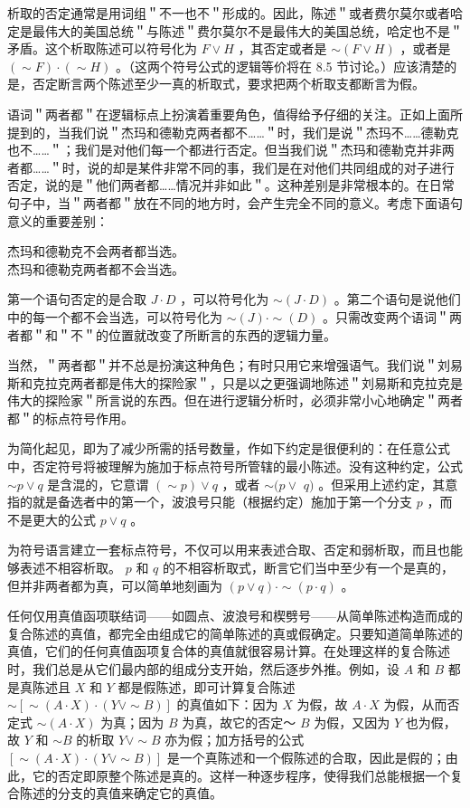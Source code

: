 析取的否定通常是用词组＂不一也不＂形成的。因此，陈述＂或者费尔莫尔或者哈定是最伟大的美国总统＂与陈述＂费尔莫尔不是最伟大的美国总统，哈定也不是＂矛盾。这个析取陈述可以符号化为 $F \vee H$ ，其否定或者是 $\sim(F \vee H)$ ，或者是 $(\sim F) \cdot(\sim H)$ 。（这两个符号公式的逻辑等价将在 8.5 节讨论。）应该清楚的是，否定断言两个陈述至少一真的析取式，要求把两个析取支都断言为假。

语词＂两者都＂在逻辑标点上扮演着重要角色，值得给予仔细的关注。正如上面所提到的，当我们说＂杰玛和德勒克两者都不……＂时，我们是说＂杰玛不……德勒克也不……＂；我们是对他们每一个都进行否定。但当我们说＂杰玛和德勒克并非两者都……＂时，说的却是某件非常不同的事，我们是在对他们共同组成的对子进行否定，说的是＂他们两者都……情况并非如此＂。这种差别是非常根本的。在日常句子中，当＂两者都＂放在不同的地方时，会产生完全不同的意义。考虑下面语句意义的重要差别：

杰玛和德勒克不会两者都当选。\\
杰玛和德勒克两者都不会当选。

第一个语句否定的是合取 $J \cdot D$ ，可以符号化为 $\sim(J \cdot D)$ 。第二个语句是说他们中的每一个都不会当选，可以符号化为 $\sim(J) \cdot \sim(D)$ 。只需改变两个语词＂两者都＂和＂不＂的位置就改变了所断言的东西的逻辑力量。

当然，＂两者都＂并不总是扮演这种角色；有时只用它来增强语气。我们说＂刘易斯和克拉克两者都是伟大的探险家＂，只是以之更强调地陈述＂刘易斯和克拉克是伟大的探险家＂所言说的东西。但在进行逻辑分析时，必须非常小心地确定＂两者都＂的标点符号作用。

为简化起见，即为了减少所需的括号数量，作如下约定是很便利的：在任意公式中，否定符号将被理解为施加于标点符号所管辖的最小陈述。没有这种约定，公式 $\sim p \vee q$ 是含混的，它意谓 $(\sim p) \vee q$ ，或者 $\sim(p \vee$ $q)$ 。但采用上述约定，其意指的就是备选者中的第一个，波浪号只能（根据约定）施加于第一个分支 $p$ ，而不是更大的公式 $p \vee q$ 。

为符号语言建立一套标点符号，不仅可以用来表述合取、否定和弱析取，而且也能够表述不相容析取。 $p$ 和 $q$ 的不相容析取式，断言它们当中至少有一个是真的，但并非两者都为真，可以简单地刻画为 $(p \vee q) \cdot \sim(p \cdot q)$ 。

任何仅用真值函项联结词——如圆点、波浪号和楔劈号——从简单陈述构造而成的复合陈述的真值，都完全由组成它的简单陈述的真或假确定。只要知道简单陈述的真值，它们的任何真值函项复合体的真值就很容易计算。在处理这样的复合陈述时，我们总是从它们最内部的组成分支开始，然后逐步外推。例如，设 $A$ 和 $B$ 都是真陈述且 $X$ 和 $Y$ 都是假陈述，即可计算复合陈述 $\sim[\sim(A \cdot X) \cdot(Y \vee \sim B)]$ 的真值如下：因为 $X$ 为假，故 $A \cdot X$ 为假，从而否定式 $\sim(A \cdot X)$ 为真；因为 $B$ 为真，故它的否定～ $B$ 为假，又因为 $Y$ 也为假，故 $Y$ 和 $\sim B$ 的析取 $Y \vee \sim B$ 亦为假；加方括号的公式 $[\sim(A \cdot X) \cdot(Y \vee \sim B)]$ 是一个真陈述和一个假陈述的合取，因此是假的；由此，它的否定即原整个陈述是真的。这样一种逐步程序，使得我们总能根据一个复合陈述的分支的真值来确定它的真值。

